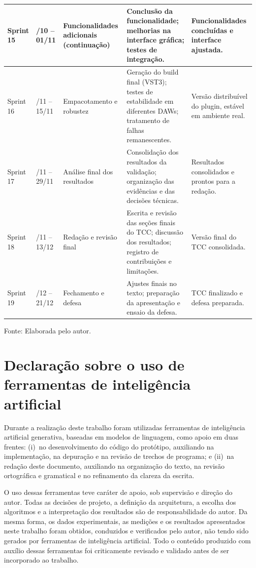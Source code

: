 \begin{longtable}{|>{\raggedright\arraybackslash}p{1.5cm}|>{\raggedright\arraybackslash}p{2.3cm}|>{\raggedright\arraybackslash}p{3.0cm}|>{\raggedright\arraybackslash}p{4.4cm}|>{\raggedright\arraybackslash}p{3.1cm}|}
Sprint 15 & 19/10 -- 01/11 & Funcionalidades adicionais (continuação) &
Conclusão da funcionalidade; melhorias na interface gráfica; testes de integração. &
Funcionalidades concluídas e interface ajustada. \\
\hline

Sprint 16 & 02/11 -- 15/11 & Empacotamento e robustez &
Geração do build final (VST3); testes de estabilidade em diferentes DAWs; tratamento de falhas remanescentes. &
Versão distribuível do plugin, estável em ambiente real. \\
\hline

Sprint 17 & 16/11 -- 29/11 & Análise final dos resultados &
Consolidação dos resultados da validação; organização das evidências e das decisões técnicas. &
Resultados consolidados e prontos para a redação. \\
\hline

Sprint 18 & 30/11 -- 13/12 & Redação e revisão final &
Escrita e revisão das seções finais do TCC; discussão dos resultados; registro de contribuições e limitações. &
Versão final do TCC consolidada. \\
\hline

Sprint 19 & 14/12 -- 21/12 & Fechamento e defesa &
Ajustes finais no texto; preparação da apresentação e ensaio da defesa. &
TCC finalizado e defesa preparada. \\
\hline

\end{longtable}

{\small Fonte: Elaborada pelo autor.}

\chapter{\label{chap:declaracao_ia}Declaração sobre o uso de ferramentas de inteligência artificial}

Durante a realização deste trabalho foram utilizadas ferramentas de
inteligência artificial generativa, baseadas em modelos de linguagem,
como apoio em duas frentes: (i)~no desenvolvimento do código do
protótipo, auxiliando na implementação, na depuração e na revisão de
trechos de programa; e (ii)~na redação deste documento, auxiliando na
organização do texto, na revisão ortográfica e gramatical e no
refinamento da clareza da escrita.

O uso dessas ferramentas teve caráter de apoio, sob supervisão e
direção do autor. Todas as decisões de projeto, a definição da
arquitetura, a escolha dos algoritmos e a interpretação dos resultados
são de responsabilidade do autor. Da mesma forma, os dados
experimentais, as medições e os resultados apresentados neste trabalho
foram obtidos, conduzidos e verificados pelo autor, não tendo sido
gerados por ferramentas de inteligência artificial. Todo o conteúdo
produzido com auxílio dessas ferramentas foi criticamente revisado e
validado antes de ser incorporado ao trabalho.